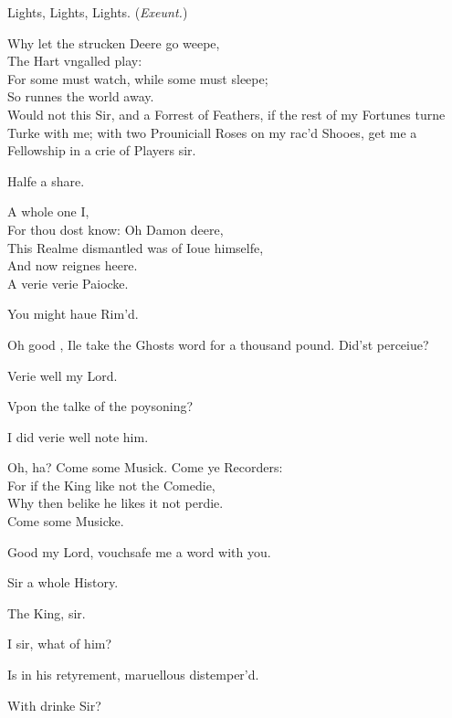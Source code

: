 \documentclass[a5paper,DIV=calc,11pt]{scrbook}
\begin{document}
\begin{drama*}
     Lights, Lights, Lights. \hfill(\textit{Exeunt.})
    
    
    \hamspeaks Why let the strucken Deere go weepe,\\
    The Hart vngalled play:\\
    For some must watch, while some must sleepe;\\
    So runnes the world away.\\
    Would not this Sir, and a Forrest of Feathers, if the rest of my Fortunes turne Turke with me; with two Prouniciall Roses on my rac'd Shooes, get me a Fellowship in a crie of Players sir.
    
    \horspeaks Halfe a share.
    
    \hamspeaks A whole one I,\\
    For thou dost know: Oh Damon deere,\\
    This Realme dismantled was of Ioue himselfe,\\
    And now reignes heere.\\
    A verie verie Paiocke.
    
    \horspeaks You might haue Rim'd.
    
    \hamspeaks Oh good \hor, Ile take the Ghosts word for a thousand pound. Did'st perceiue?
    
    \horspeaks Verie well my Lord.
    
    \hamspeaks Vpon the talke of the poysoning?
    
    \horspeaks I did verie well note him.
    
    
    \hamspeaks Oh, ha? Come some Musick. Come ye Recorders:\\
    For if the King like not the Comedie,\\
    Why then belike he likes it not perdie.\\
    Come some Musicke.
    
    \guilspeaks Good my Lord, vouchsafe me a word with you.
    
    \hamspeaks Sir a whole History.
    
    \guilspeaks The King, sir.
    
    \hamspeaks I sir, what of him?
    
    \guilspeaks Is in his retyrement, maruellous distemper'd.
    
    \hamspeaks With drinke Sir?
    

\end{drama*}
\end{document}
